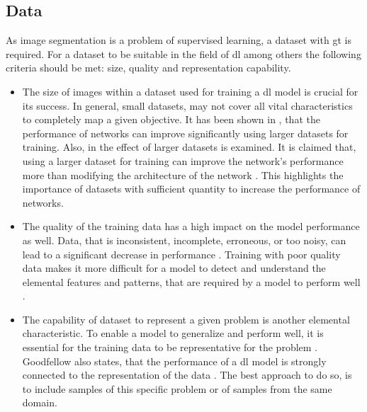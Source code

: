 \subsection{Data}\label{ord:ch2:sec2:subsec_data}
As image segmentation is a problem of supervised learning, a dataset with \gls{gt} is required.
For a dataset to be suitable in the field of \gls{dl} among others the following criteria should be met: size, quality and representation capability.
\begin{itemize}
	\item The size of images within a dataset used for training a \gls{dl} model is crucial for its success.
	In general, small datasets, may not cover all vital characteristics to completely map a given objective.
	It has been shown in \cite{Banko01-ScalingData}, that the performance of networks can improve significantly using larger datasets for training.
	Also, in \cite{Halevy09-UnreasonableEffectivenessOfData} the effect of larger datasets is examined. 
	It is claimed that, using a larger dataset for training can improve the network's performance more than modifying the architecture of the network \cite{Ger17-HandsOn}.
	This highlights the importance of datasets with sufficient quantity to increase the performance of networks.
	\item The quality of the training data has a high impact on the model performance as well.
	Data, that is inconsistent, incomplete, erroneous, or too noisy, can lead to a significant decrease in performance \cite{Gudivada2017-DataQuality}.
	Training with poor quality data makes it more difficult for a model to detect and understand the elemental features and patterns, that are required by a model to perform well \cite{Ger17-HandsOn}.
	\item The capability of dataset to represent a given problem is another elemental characteristic.
	To enable a model to generalize and perform well, it is essential for the training data to be representative for the problem \cite{Ger17-HandsOn}.
	Goodfellow \etal also states, that the performance of a \gls{dl} model is strongly connected to the representation of the data \cite{Goodfellow-et-al-2016}.
	The best approach to do so, is to include samples of this specific problem or of samples from the same domain.	
	

\end{itemize}
